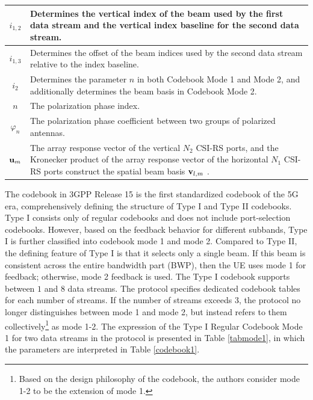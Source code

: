 \documentclass[lettersize,journal]{IEEEtran}
\begin{document}
\begin{table}[t]
\begin{center}
\begin{tabular}{|c|m{6cm}|}
\hline   $i_{1,2}$ & 
Determines the vertical index of the beam used by the first  data stream and the vertical index baseline for the second data stream.\\
\hline   $i_{1,3}$ & Determines the offset of the beam indices used by the second data stream relative to the index baseline.\\
\hline   $i_2$ & Determines the parameter $n$ in both Codebook Mode 1 and Mode 2, and additionally determines the beam basis in Codebook Mode 2.\\
\hline   $n$ & The polarization phase index.\\
\hline   $\varphi_{n}$  & The polarization phase coefficient between two groups of polarized antennas.\\ 
\hline   ${\bf{u}}_{m}$ & The array response vector of the vertical $N_{2}$ CSI-RS ports, and the Kronecker product of the array response vector of the horizontal $N_{1}$ CSI-RS ports construct the spatial beam basis ${\bf{v}}_{l,m}$ .\\ 
\hline   
\end{tabular}   
\end{center}   
\vspace{-10pt}
\end{table}

The codebook in 3GPP Release 15 is the first standardized codebook of the 5G era, comprehensively defining the structure of Type I and Type II codebooks. Type I consists only of regular codebooks and does not include port-selection codebooks. However, based on the feedback behavior for different subbands, Type I is further classified into codebook mode 1 and mode 2. Compared to Type II, the defining feature of Type I is that it selects only a single beam. If this beam is consistent across the entire bandwidth part (BWP), then the UE uses mode 1 for feedback; otherwise, mode 2 feedback is used. The Type I codebook supports between $1$ and $8$ data streams. The protocol specifies dedicated codebook tables for each number of streams. If the number of streams exceeds 3, the protocol no longer distinguishes between mode 1 and mode 2, but instead refers to them collectively\footnote{Based on the design philosophy of the codebook, the authors consider mode 1-2 to be the extension of mode 1.} as mode 1-2. The expression of the Type I Regular Codebook Mode 1 for two data streams in the protocol is presented in Table \ref{tabmode1}, in which the parameters are interpreted in Table \ref{codebook1}. 
\end{document}
